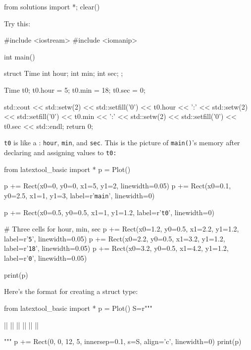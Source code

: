 \begin{python0}
from solutions import *; clear()
\end{python0}

Try this:

\begin{consolethree}[escapeinside=||]
#include <iostream>
#include <iomanip>

int main()
{
    struct Time
    {
        int hour;
        int min;
        int sec;
    };

    Time t0;
    t0.hour = 5;
    t0.min = 18;
    t0.sec = 0;

    std::cout << std::setw(2) << std::setfill('0')
              << t0.hour << ':'
              << std::setw(2) << std::setfill('0')
              << t0.min << ':'
              << std::setw(2) << std::setfill('0')
              << t0.sec
              << std::endl;
    return 0;
}
\end{consolethree}

\texttt{t0} is like a :
\texttt{hour}, \texttt{min}, and \texttt{sec}. This is the picture of
\texttt{main()}'s memory after declaring and assigning
values to \texttt{t0:}

\begin{python}
from latextool_basic import *
p = Plot()

p += Rect(x0=0, y0=0, x1=5, y1=2, linewidth=0.05)
p += Rect(x0=0.1, y0=2.5, x1=1, y1=3, label=r'{\tt main}', linewidth=0)

p += Rect(x0=0.5, y0=0.5, x1=1, y1=1.2, label=r'{\tt t0}', linewidth=0)

# Three cells for hour, min, sec
p += Rect(x0=1.2, y0=0.5, x1=2.2, y1=1.2, label=r'{\tt 5}', linewidth=0.05)
p += Rect(x0=2.2, y0=0.5, x1=3.2, y1=1.2, label=r'{\tt 18}', linewidth=0.05)
p += Rect(x0=3.2, y0=0.5, x1=4.2, y1=1.2, label=r'{\tt 0}', linewidth=0.05)

print(p)
\end{python}

Here's the format for creating a struct type:

\begin{python}
from latextool_basic import *
p = Plot()
S=r"""
\begin{consolethree}[escapeinside=||]
||
|\EMPHASIZE{\{}|
    ||
    ||
    ||
|\EMPHASIZE{\};}|
\end{consolethree}
"""
p += Rect(0, 0, 12, 5, innersep=0.1, s=S, align='c', linewidth=0)
print(p)
\end{python}

